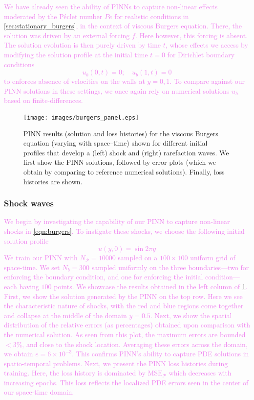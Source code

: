 \documentclass[11pt]{article}
\newcommand{\mse}{\textrm{MSE}}
\newcommand{\pde}{\ensuremath{\mathcal{P}}}
\newcommand{\newcontent}[1]{\textcolor{violet}{#1}}
\begin{document}
\newcontent{
We have already seen the ability of PINNs to capture non-linear
effects moderated by the Péclet number \(Pe\) for realistic
conditions in \cref{sec:stationary_burgers}, in the context of viscous Burgers
equation. There, the solution was driven by an external forcing \(f\). Here
however, this forcing is absent. The solution evolution is then purely driven
by time \(t\), whose effects we access by modifying the solution profile at
the initial time \(t = 0\) for Dirichlet boundary conditions
\[ u_b(0, t) = 0;\quad  u_b(1, t) = 0 \]
to enforces absence of velocities on the walls at \(y = 0, 1\).
To compare against our PINN solutions in these settings, we once again rely
on numerical solutions \({u}_h\) based on finite-differences.
}

\begin{figure}[htbp]
\centering
\texttt{[image: images/burgers\_panel.eps]}
\caption{\label{fig:burgers_results}PINN results (solution and loss histories) for the viscous Burgers equation (varying with space--time) shown for different initial profiles that develop a (left) shock and (right) rarefaction waves. We first show the PINN solutions, followed by error plots (which we obtain by comparing to reference numerical solutions). Finally, loss histories are shown.}
\end{figure}

\subsubsection{Shock waves}
\label{sec:org997b945}
\newcontent{
We begin by investigating the capability of our PINN to capture non-linear shocks in
\cref{eqn:burgers}. To instigate these shocks, we
choose the following initial solution profile
\[ u(y, 0) = \sin{2 \pi y}\]
}
\newcontent{
We train our PINN with \(N_\pde = 10000\) sampled on a \(100 \times 100\) uniform
grid of space-time. We set \(N_b = 300\) sampled uniformly on
the three boundaries---two for enforcing the boundary condition, and one for
enforcing the initial condition---each having \(100\) points. We showcase
the results obtained
in the left column of \cref{fig:burgers_results}. First, we show the
solution generated by the PINN on the top row. Here we see the
characteristic nature of shocks, with the red and blue regions come together
and collapse at the middle of the domain \(y = 0.5\). Next, we show the spatial
distribution of the relative errors (as percentages) obtained upon
comparison with the numerical solution. As
seen from this plot, the maximum errors are bounded \(< 3\%\), and close to
the shock location. Averaging these errors across the domain, we obtain \(e = 6 \times 10^{-3}\).
This confirms PINN's ability to capture PDE solutions in spatio-temporal
problems. Next, we present the PINN loss histories
during training.
Here, the loss history is dominated by \(\mse_\pde\) which decreases with
increasing epochs. This loss reflects the localized PDE errors seen in the
center of our space-time domain.
}
\end{document}
